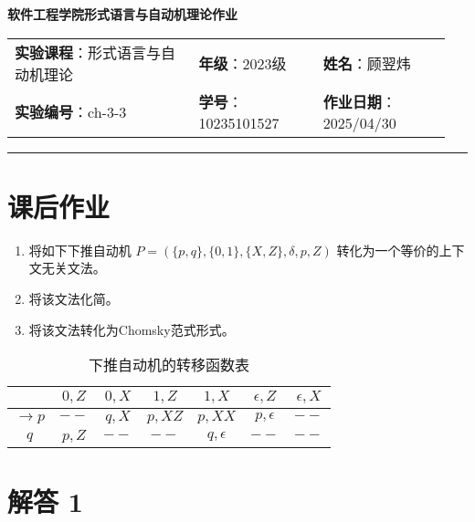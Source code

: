 \documentclass{article}
\begin{document}
	
	\begin{center}
		{\Large{\textbf{\heiti 软件工程学院形式语言与自动机理论作业}}}
		\begin{table}[htb]
			\flushleft
			\begin{tabular}{p{0.4\linewidth}p{0.27\linewidth}p{0.28\linewidth}}\\
				\textbf{实验课程}：形式语言与自动机理论  & \textbf{年级}：2023级       & \textbf{姓名}：顾翌炜  \\
				\textbf{实验编号}：ch-3-3    & \textbf{学号}：10235101527 & \textbf{作业日期}：2025/04/30  \\
			\end{tabular}
		\end{table}
	\end{center}
	\rule{\textwidth}{2pt}
	
	\section*{课后作业}
	
	\begin{enumerate}[noitemsep, label={{\arabic*})}]
		\item 将如下下推自动机 $P = (\{p, q\}, \{0, 1\}, \{X, Z\}, \delta, p, Z)$
		转化为一个等价的上下文无关文法。
		\item 将该文法化简。
		\item 将该文法转化为Chomsky范式形式。
	\end{enumerate}\textbf{}
	
	\begin{table}[htbp]
		\centering
		\caption{下推自动机的转移函数表}
		\label{tab:transition}
		\begin{tabular}{|c|c|c|c|c|c|c|}
			\hline
			& $0, Z$ & $0, X$ & $1, Z$ & $1, X$ & $\epsilon, Z$ & $\epsilon, X$ \\
			\hline
			$\to p$ & $--$ & $q, X$ & $p, XZ$ & $p, XX$ & $p, \epsilon$ & $--$ \\
			\hline
			$q$ & $p, Z$ & $--$ & $--$ & $q, \epsilon$ & $--$ & $--$ \\
			\hline
		\end{tabular}
	\end{table}
	
	\section*{解答 1}
	
\end{document}
